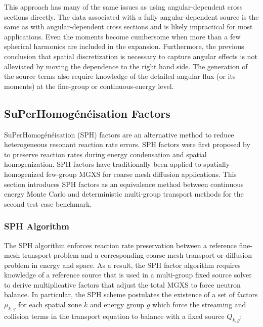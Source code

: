 This approach has many of the same issues as using angular-dependent cross sections directly.  The data associated with a fully angular-dependent source is the same as with angular-dependent cross sections and is likely impractical for most applications.  Even the moments become cumbersome when more than a few spherical harmonics are included in the expansion.  Furthermore, the previous conclusion that spatial discretization is necessary to capture angular effects is not alleviated by moving the dependence to the right hand side.  The generation of the source terms also require knowledge of the detailed angular flux (or its moments) at the fine-group or continuous-energy level.

\subsection{SuPerHomog\'{e}n\'{e}isation Factors}
\label{subsec:sph}

SuPerHomog\'{e}n\'{e}isation (SPH) factors are an alternative method to reduce heterogeneous resonant reaction rate errors. SPH factors were first proposed by~\cite{hebert1993consistent} to preserve reaction rates during energy condensation and spatial homogenization. SPH factors have traditionally been applied to spatially-homogenized few-group MGXS for coarse mesh diffusion applications. This section introduces SPH factors as an equivalence method between continuous energy Monte Carlo and deterministic multi-group transport methods for the second test case benchmark.

\subsubsection{SPH Algorithm}
\label{subsubsec:sph-algorithm}


The SPH algorithm enforces reaction rate preservation between a reference fine-mesh transport problem and a corresponding coarse mesh transport or diffusion problem in energy and space. As a result, the SPH factor algorithm requires knowledge of a reference source that is used in a multi-group fixed source solver to derive multiplicative factors that adjust the total MGXS to force neutron balance. In particular, the SPH scheme postulates the existence of a set of factors $\mu_{k,g}$ for each spatial zone $k$ and energy group $g$ which force the streaming and collision terms in the transport equation to balance with a fixed source $Q_{k,g}$:

